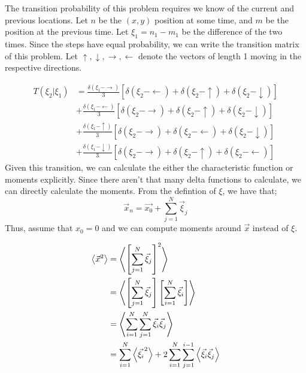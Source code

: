 \begin{solution}
	The transition probability of this problem requires we know of the current and previous locations. Let $n$ be the $(x,y)$ position at some time, and $m$ be the position at the previous time. Let $\xi_1 = n_1 - m_1$ be the difference of the two times. Since the steps have equal probability, we can write the transition matrix of this problem. Let $\uparrow, \downarrow, \rightarrow, \leftarrow$ denote the vectors of length 1 moving in the respective directions.

	\begin{equation}
		\begin{aligned}
			T(\xi_2 | \xi_1) &= \frac{\delta(\xi_1 - \rightarrow)}{3} \left[ \delta(\xi_2 - \leftarrow) + \delta(\xi_2 - \uparrow) + \delta(\xi_2 - \downarrow)\right]\\
							&+ \frac{\delta(\xi_1 - \leftarrow)}{3} \left[ \delta(\xi_2 - \rightarrow) + \delta(\xi_2 - \uparrow) + \delta(\xi_2 - \downarrow)\right] \\
							&+ \frac{\delta(\xi_1 - \uparrow)}{3} \left[ \delta(\xi_2 - \rightarrow) + \delta(\xi_2 - \leftarrow) + \delta(\xi_2 - \downarrow)\right] \\
							&+ \frac{\delta(\xi_1 - \downarrow)}{3} \left[ \delta(\xi_2 - \rightarrow) + \delta(\xi_2 - \uparrow) + \delta(\xi_2 - \leftarrow)\right]
		\end{aligned}
	\end{equation}
	Given this transition, we can calculate the either the characteristic function or moments explicitly. Since there aren't that many delta functions to calculate, we can directly calculate the moments. From the defintion of $\xi$, we have that;
	\begin{equation}
		\vec x_n = \vec{x_0} + \sum_{j=1}^N \vec \xi_j
	\end{equation}
	Thus, assume that $x_0=0$ and we can compute moments around $\vec x$ instead of $\xi$.

	\begin{equation}
		\begin{aligned}
			\left\langle{\vec x^2}\right\rangle &= \left\langle{\left[\sum_{j=1}^N \vec \xi_j\right]^2}\right\rangle \\
			&= \left\langle{\left[\sum_{j=1}^N \vec \xi_j\right]\left[\sum_{i=1}^N \vec \xi_i\right]}\right\rangle \\
			&= \left\langle{\sum_{i=1}^N \sum_{j=1}^N \vec \xi_i\vec \xi_j}\right\rangle \\
			&= \sum_{i=1}^N\left\langle{\vec{\xi_i}^2}\right\rangle + 2\sum_{i=1}^N \sum_{j=1}^{i-1} \left\langle{\vec \xi_i \vec \xi_j}\right\rangle
		\end{aligned}
	\end{equation}


\end{solution}
